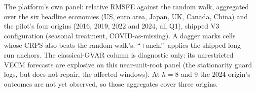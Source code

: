 \begin{table}[t]
\centering
\caption{The platform's own panel: relative RMSFE against the random walk, aggregated over
the six headline economies (US, euro area, Japan, UK, Canada, China) and the pilot's four
origins (2016, 2019, 2022 and 2024, all Q1), shipped V3 configuration (seasonal
treatment, COVID-as-missing). A dagger marks cells whose CRPS also beats the random
walk's. ``+anch.''\ applies the shipped long-run anchors. The classical-GVAR column is
diagnostic only: its unrestricted VECM forecasts are explosive on this near-unit-root
panel (the stationarity guard logs, but does not repair, the affected windows). At
$h=8$ and $9$ the 2024 origin's outcomes are not yet observed, so those aggregates
cover three origins.}
\label{tab:ourpanel}
\footnotesize\setlength{\tabcolsep}{3.5pt}
\begin{center}

\end{center}
\end{table}

